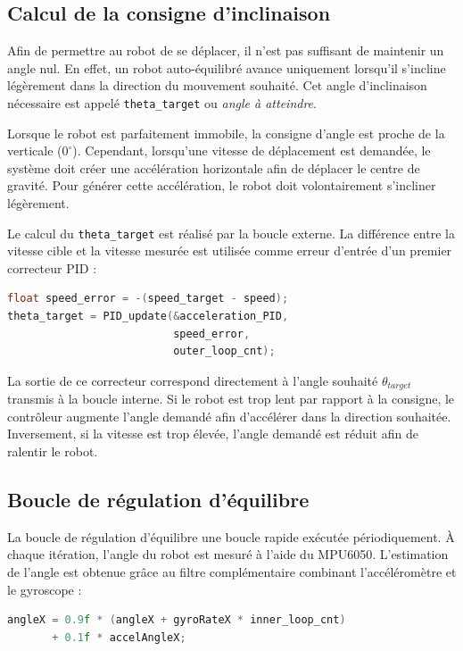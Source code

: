 \subsection{Calcul de la consigne d'inclinaison}

Afin de permettre au robot de se déplacer, il n'est pas suffisant de maintenir un angle nul. En effet, un robot auto-équilibré avance uniquement lorsqu'il s'incline légèrement dans la direction du mouvement souhaité. Cet angle d'inclinaison nécessaire est appelé \texttt{theta\_target} ou \textit{angle à atteindre}.

Lorsque le robot est parfaitement immobile, la consigne d'angle est proche de la verticale ($0^\circ$). Cependant, lorsqu'une vitesse de déplacement est demandée, le système doit créer une accélération horizontale afin de déplacer le centre de gravité. Pour générer cette accélération, le robot doit volontairement s'incliner légèrement.

Le calcul du \texttt{theta\_target} est réalisé par la boucle externe. La différence entre la vitesse cible et la vitesse mesurée est utilisée comme erreur d'entrée d'un premier correcteur PID :

\begin{lstlisting}[language=C++]
float speed_error = -(speed_target - speed);
theta_target = PID_update(&acceleration_PID,
                          speed_error,
                          outer_loop_cnt);
\end{lstlisting}

La sortie de ce correcteur correspond directement à l'angle souhaité $\theta_{target}$ transmis à la boucle interne. Si le robot est trop lent par rapport à la consigne, le contrôleur augmente l'angle demandé afin d'accélérer dans la direction souhaitée. Inversement, si la vitesse est trop élevée, l'angle demandé est réduit afin de ralentir le robot.

\subsection{Boucle de régulation d'équilibre}

La boucle de régulation d'équilibre une boucle rapide exécutée périodiquement. À chaque itération, l'angle du robot est mesuré à l'aide du MPU6050. L'estimation de l'angle est obtenue grâce au filtre complémentaire combinant l'accéléromètre et le gyroscope :

\begin{lstlisting}[language=C++]
angleX = 0.9f * (angleX + gyroRateX * inner_loop_cnt)
       + 0.1f * accelAngleX;
\end{lstlisting}


